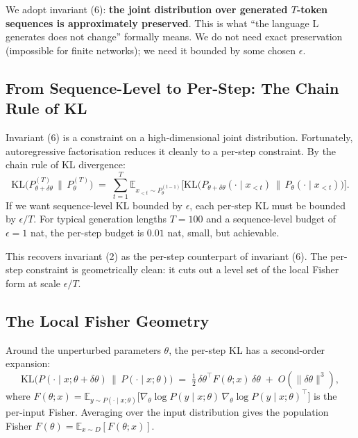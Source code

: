 \documentclass[11pt, a4paper]{article}
\theoremstyle{plain}
\theoremstyle{definition}
\theoremstyle{remark}
\begin{document}
We adopt invariant (6): \textbf{the joint distribution over generated $T$-token sequences is approximately preserved}.
This is what ``the language L generates does not change'' formally means.
We do not need exact preservation (impossible for finite networks); we need it bounded by some chosen $\epsilon$.

\subsection{From Sequence-Level to Per-Step: The Chain Rule of KL}

Invariant (6) is a constraint on a high-dimensional joint distribution.
Fortunately, autoregressive factorisation reduces it cleanly to a per-step constraint.
By the chain rule of KL divergence:
\begin{equation}
\mathrm{KL}\!\big(P^{(T)}_{\theta+\delta\theta} \,\|\, P^{(T)}_\theta\big) \;=\; \sum_{t=1}^{T} \mathbb{E}_{x_{<t} \sim P^{(t-1)}_\theta}\!\Big[\mathrm{KL}\!\big(P_{\theta+\delta\theta}(\cdot \mid x_{<t}) \,\|\, P_\theta(\cdot \mid x_{<t})\big)\Big].
\label{eq:chain-rule-kl}
\end{equation}
If we want sequence-level KL bounded by $\epsilon$, each per-step KL must be bounded by $\epsilon / T$.
For typical generation lengths $T = 100$ and a sequence-level budget of $\epsilon = 1$ nat, the per-step budget is $0.01$ nat, small, but achievable.

This recovers invariant (2) as the per-step counterpart of invariant (6).
The per-step constraint is geometrically clean: it cuts out a level set of the local Fisher form at scale $\epsilon / T$.

\subsection{The Local Fisher Geometry}

Around the unperturbed parameters $\theta$, the per-step KL has a second-order expansion:
\begin{equation}
\mathrm{KL}\!\big(P(\cdot \mid x; \theta + \delta\theta) \,\|\, P(\cdot \mid x; \theta)\big) \;=\; \tfrac{1}{2}\,\delta\theta^{\!\top} F(\theta; x) \,\delta\theta \;+\; O(\|\delta\theta\|^{3}),
\end{equation}
where $F(\theta; x) = \mathbb{E}_{y \sim P(\cdot \mid x; \theta)}\!\big[\nabla_\theta \log P(y \mid x; \theta)\, \nabla_\theta \log P(y \mid x; \theta)^{\!\top}\big]$ is the per-input Fisher.
Averaging over the input distribution gives the population Fisher $F(\theta) = \mathbb{E}_{x \sim D}[F(\theta; x)]$.
\end{document}
